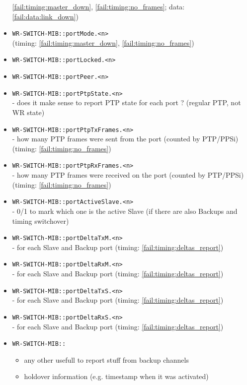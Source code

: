 \begin{itemize}[leftmargin=0pt]
		\ref{fail:timing:master_down}, \ref{fail:timing:no_frames}; data:
		\ref{fail:data:link_down})
	\item [] \texttt{WR-SWITCH-MIB::portMode.<n>}\\ (timing:
		\ref{fail:timing:master_down}, \ref{fail:timing:no_frames})
	\item [] \texttt{WR-SWITCH-MIB::portLocked.<n>}
	\item [] \texttt{WR-SWITCH-MIB::portPeer.<n>}
	\item [] \texttt{WR-SWITCH-MIB::portPtpState.<n>}\\ - does it make sense to
		report PTP state for each port ? (regular PTP, not WR state)
	\item [] \texttt{WR-SWITCH-MIB::portPtpTxFrames.<n>}\\ - how many PTP frames
		were sent from the port (counted by PTP/PPSi) (timing:
		\ref{fail:timing:no_frames})
	\item [] \texttt{WR-SWITCH-MIB::portPtpRxFrames.<n>}\\ - how many PTP frames
		were received on the port (counted by PTP/PPSi) (timing:
		\ref{fail:timing:no_frames})
	\item [] \texttt{WR-SWITCH-MIB::portActiveSlave.<n>}\\ - 0/1 to mark which one
		is the active Slave (if there are also Backups and timing switchover)
	\item [] \texttt{WR-SWITCh-MIB::portDeltaTxM.<n>}\\ - for each Slave and
		Backup port (timing: \ref{fail:timing:deltas_report})
	\item [] \texttt{WR-SWITCH-MIB::portDeltaRxM.<n>}\\ - for each Slave and
		Backup port (timing: \ref{fail:timing:deltas_report})
	\item [] \texttt{WR-SWITCH-MIB::portDeltaTxS.<n>}\\ - for each Slave and
		Backup port (timing: \ref{fail:timing:deltas_report})
	\item [] \texttt{WR-SWITCH-MIB::portDeltaRxS.<n>}\\ - for each Slave and
		Backup port (timing: \ref{fail:timing:deltas_report})
	\item [] \texttt{WR-SWITCH-MIB::}
		\begin{itemize}[topsep=-12pt]
			\item any other usefull to report stuff from backup channels
			\item holdover information (e.g. timestamp when it was activated)
		\end{itemize}
\end{itemize}

